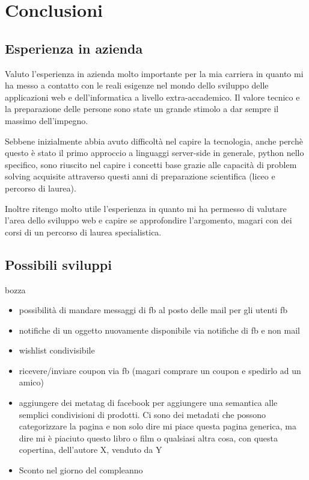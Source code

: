 \chapter{Conclusioni}
\section{Esperienza in azienda}
Valuto l'esperienza in azienda molto importante per la mia carriera in quanto mi ha messo a contatto con le reali esigenze nel mondo dello sviluppo delle applicazioni web e dell'informatica a livello extra-accademico. Il valore tecnico e la preparazione delle persone sono state un grande stimolo a dar sempre il massimo dell'impegno.

Sebbene inizialmente abbia avuto difficoltà nel capire la tecnologia, anche perchè questo è stato il primo approccio a linguaggi server-side in generale, python nello specifico, sono riuscito nel capire i concetti base grazie alle capacità di problem solving acquisite attraverso questi anni di preparazione scientifica (liceo e percorso di laurea). 

Inoltre ritengo molto utile l'esperienza in quanto mi ha permesso di valutare l'area dello sviluppo web e capire se approfondire l'argomento, magari con dei corsi di un percorso di laurea specialistica.

\section{Possibili sviluppi}
bozza


\begin{itemize}
	\item possibilità di mandare messaggi di fb al posto delle mail per gli utenti fb
	\item notifiche di un oggetto nuovamente disponibile via notifiche di fb e non mail
	\item wishlist condivisibile
	\item ricevere/inviare coupon via fb (magari comprare un coupon e spedirlo ad un amico)
	\item aggiungere dei metatag di facebook per aggiungere una semantica alle semplici condivisioni di prodotti. Ci sono dei metadati che possono categorizzare la pagina e non solo dire mi piace questa pagina generica, ma dire mi è piaciuto questo libro o film o qualsiasi altra cosa, con questa copertina, dell’autore X, venduto da Y
	\item Sconto nel giorno del compleanno
\end{itemize}
